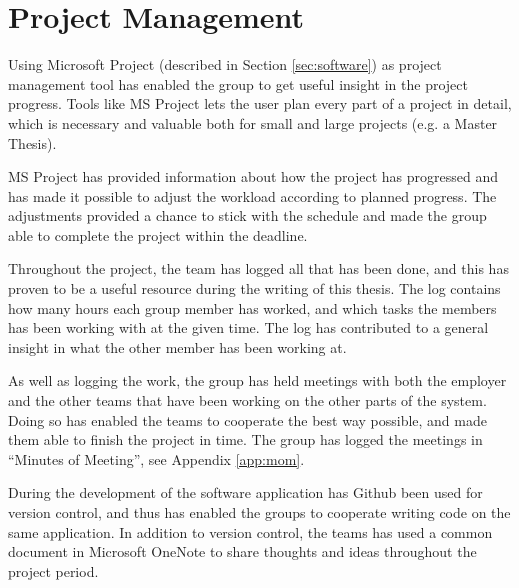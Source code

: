 \chapter{Project Management}
\label{cha:projectmanagement}
Using Microsoft Project (described in Section \ref{sec:software}) as project management tool has enabled the group to get useful insight in the project progress. Tools like MS Project lets the user plan every part of a project in detail, which is necessary and valuable both for small and large projects (e.g. a Master Thesis).

MS Project has provided information about how the project has progressed and has made it possible to adjust the workload according to planned progress. The adjustments provided a chance to stick with the schedule and made the group able to complete the project within the deadline.

Throughout the project, the team has logged all that has been done, and this has proven to be a useful resource during the writing of this thesis. The log contains how many hours each group member has worked, and which tasks the members has been working with at the given time. The log has contributed to a general insight in what the other member has been working at.

As well as logging the work, the group has held meetings with both the employer and the other teams that have been working on the other parts of the system. Doing so has enabled the teams to cooperate the best way possible, and made them able to finish the project in time. The group has logged the meetings in ``Minutes of Meeting'', see Appendix \ref{app:mom}.

During the development of the software application has Github   been used for version control, and thus has enabled the groups to cooperate writing code on the same application. In addition to version control, the teams has used a common document in Microsoft OneNote to share thoughts and ideas throughout the project period.